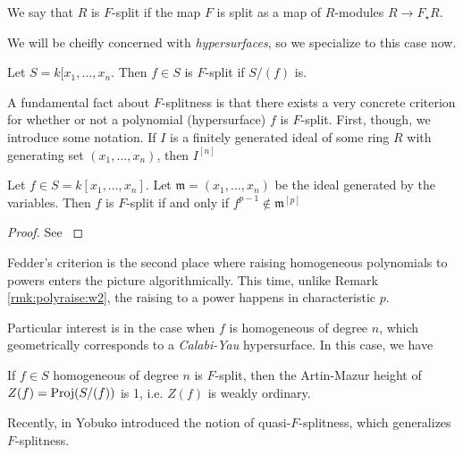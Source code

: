 \begin{defn}
	We say that \(R\) is \(F\)-split if the map \(F\) is
	split as a map of 
	\(R\)-modules \(R \xrightarrow{} F_{\star}R\).
\end{defn}

We will be cheifly concerned with \textit{hypersurfaces},
so we specialize to this case now.

\begin{defn}
	Let \(S = k[x_{1}, \ldots, x_{n}\).
	Then \(f \in S\) is \(F\)-split if 
	\(S / (f)\) is.
\end{defn}

A fundamental fact about \(F\)-splitness is that there
exists a very concrete criterion for whether or 
not a polynomial (hypersurface) \(f\) is \(F\)-split.
First, though, we introduce some notation.
If \(I\) is a finitely generated 
ideal of some ring \(R\) 
with generating set \((x_{1}, \ldots, x_{n})\),
then \(I^{[n]}\)

\begin{thm}
	Let \(f \in S = k[x_{1}, \ldots, x_{n}]\).
	Let \(\mathfrak{m} = (x_{1}, \ldots, x_{n})\) 
	be the ideal generated by the variables.
	Then \(f\) is \(F\)-split if and only if 
	\(f^{p-1} \notin \mathfrak{m}^{[p]}\)
\end{thm}

\begin{proof}
	See \cite[Theorem~2.5]{ma-polstra-2021-F-sing-comm-alg}
\end{proof}

\begin{rmk}
	Fedder's criterion is the second place where raising
	homogeneous polynomials to powers enters the picture
	algorithmically.
	This time, unlike Remark \ref{rmk:polyraise:w2},
	the raising to a power happens in characteristic \(p\).
\end{rmk}

Particular interest is in the case when \(f\) is 
homogeneous of degree \(n\), which geometrically
corresponds to a \textit{Calabi-Yau} hypersurface.
In this case, we have

\begin{thm}
	\label{thm:fsplit:ordinary}
	If \(f \in S\) 
	homogeneous of degree \(n\) 
	is \(F\)-split,
	then the Artin-Mazur height 
	of \(Z(f) = \operatorname{Proj} (S / (f))\) 
	is 1, i.e. \(Z(f)\) is weakly ordinary.
\end{thm}

Recently, in \cite{yobuko-2019-qfs-calabi-yau}
Yobuko introduced the notion of 
quasi-\(F\)-splitness, which generalizes \(F\)-splitness.

